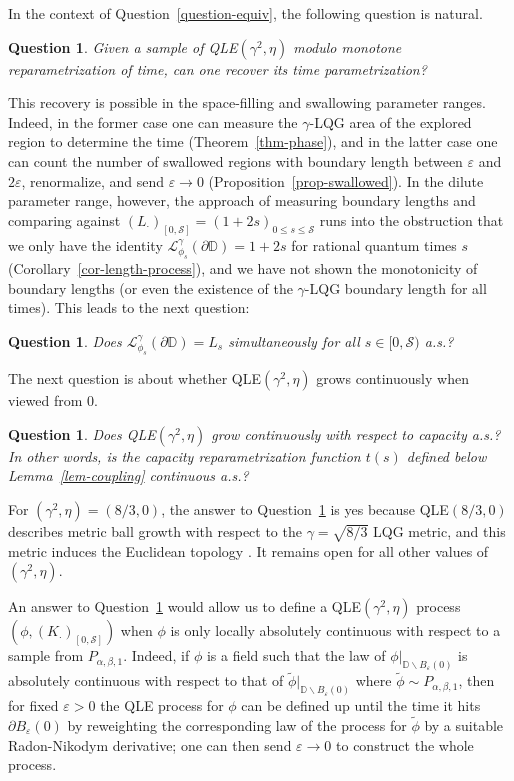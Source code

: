 \documentclass[a4paper]{article}
\numberwithin{equation}{section}
\def\eps{\varepsilon}
\newcommand{\D}{\mathbb{D}}
\newcommand{\cL}{\mathcal{L}}
\newcommand{\qduration}{\mathcal{S}}
\newtheorem{question}[theorem]{Question}
\theoremstyle{remark}
\numberwithin{equation}{section}
\begin{document}
In the context of Question~\ref{question-equiv}, the following question is natural. 
\begin{question}\label{question-recover-time}
    Given a sample of QLE$(\gamma^2, \eta)$ modulo monotone reparametrization of time, can one recover its time parametrization? 
\end{question}
This recovery is possible in the space-filling and swallowing parameter ranges. Indeed, in the former case one can measure the $\gamma$-LQG area of the explored region to determine the time (Theorem~\ref{thm-phase}), and in the latter case one can count the number of swallowed regions with boundary length between $\eps$ and $2\eps$, renormalize, and send $\eps \to 0$ (Proposition~\ref{prop-swallowed}). In the dilute parameter range, however, the approach of measuring boundary lengths and comparing against $(L_\cdot)_{[0,\qduration]} = (1 + 2s)_{0 \leq s \leq \qduration}$ runs into the obstruction that we only have the identity $\cL^\gamma_{\phi_s}(\partial \D) = 1+2s$ for rational quantum times $s$ (Corollary~\ref{cor-length-process}), and we have not shown the monotonicity of boundary lengths (or even the existence of the $\gamma$-LQG boundary length for all times). This leads to the next question:

\begin{question}\label{question-lengths}
    Does $\cL^\gamma_{\phi_s}(\partial \D) = L_s$ simultaneously for all $s \in [0,\qduration)$ a.s.?
\end{question}

 
The next question is about whether QLE$(\gamma^2, \eta)$ grows continuously when viewed from 0. 
\begin{question}\label{question-continuous}
    Does QLE$(\gamma^2, \eta)$ grow continuously with respect to capacity a.s.? In other words, is the capacity reparametrization function $t(s)$ defined below Lemma~\ref{lem-coupling} continuous a.s.? 
\end{question}
For $(\gamma^2, \eta) = (8/3,0)$, the answer to Question~\ref{question-continuous} is yes because QLE$(8/3,0)$ describes metric ball growth with respect to the $\gamma = \sqrt{8/3}$ LQG metric, and this metric induces the Euclidean topology \cite{ms-equiavlence-2}. It remains open for all other values of $(\gamma^2, \eta)$. 

An answer to Question~\ref{question-continuous} would allow us to define a QLE$(\gamma^2, \eta)$ process $(\phi, (K_\cdot)_{[0,\qduration]})$ when $\phi$ is only locally absolutely continuous with respect to a sample from $P_{\alpha, \beta, 1}$. Indeed, if $\phi$ is a field such that the law of $\phi|_{\D \backslash B_\eps(0)}$ is absolutely continuous with respect to that of $\tilde\phi|_{\D \backslash B_\eps(0)}$ where $\tilde\phi \sim P_{\alpha, \beta, 1}$, then for fixed $\eps>0$ the QLE process for $\phi$ can be defined up until the time it hits $\partial B_{\eps}(0)$ by reweighting the corresponding law of the process for $\tilde \phi$ by a suitable Radon-Nikodym derivative; one can then send $\eps \to 0$ to construct the whole process. 
\end{document}
